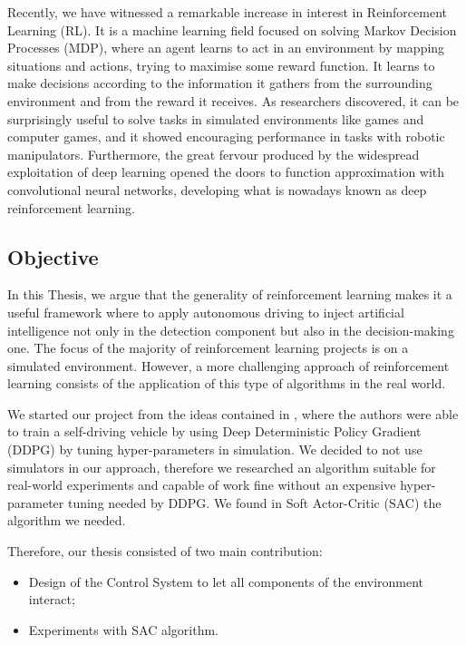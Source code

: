 \documentclass[10pt,twocolumn,letterpaper]{article}
\begin{document}
Recently, we have witnessed a remarkable increase in interest in Reinforcement Learning (RL). It is a machine learning field focused on solving Markov Decision Processes (MDP), where an agent learns to act in an environment by mapping situations and actions, trying to maximise some reward function. It learns to make decisions according to the information it gathers from the surrounding environment and from the reward it receives.
As researchers discovered, it can be surprisingly useful to solve tasks in simulated environments like games and computer games, and it showed encouraging performance in tasks with robotic manipulators. Furthermore, the great fervour produced by the widespread exploitation of deep learning opened the doors to function approximation with convolutional neural networks, developing what is nowadays known as deep reinforcement learning.

\subsection{Objective}

In this Thesis, we argue that the generality of reinforcement learning makes it a useful framework where to apply autonomous driving to inject artificial intelligence not only in the detection component but also in the decision-making one.
The focus of the majority of reinforcement learning projects is on a simulated environment. However, a more challenging approach of reinforcement learning consists of the application of this type of algorithms in the real world.

We started our project from the ideas contained in \cite{kendall2019learning}, where the authors were able to train a self-driving vehicle by using Deep Deterministic Policy Gradient (DDPG) \cite{lillicrap2015continuous} by tuning hyper-parameters in simulation. We decided to not use simulators in our approach, therefore we researched an algorithm suitable for real-world experiments and capable of work fine without an expensive hyper-parameter tuning needed by DDPG. We found in Soft Actor-Critic (SAC) \cite{haarnoja2018soft} the algorithm we needed.

Therefore, our thesis consisted of two main contribution:
\begin{itemize}
    \item Design of the Control System to let all components of the environment interact;
    \item Experiments with SAC algorithm.
\end{itemize}
\end{document}
